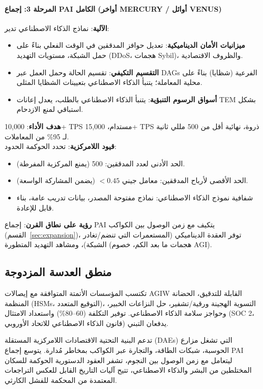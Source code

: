 \documentclass[11pt]{article}
\begin{document}
\paragraph{المرحلة 3: إجماع PAI الكامل (أواخر MERCURY / أوائل VENUS)}
\textbf{الآلية}: نماذج الذكاء الاصطناعي تدير:
\begin{itemize}[noitemsep]
  \item \textbf{ميزانيات الأمان الديناميكية}: تعديل حوافز المدققين في الوقت الفعلي بناءً على حمل الشبكة، مستويات التهديد (DDoS، هجمات Sybil)، والظروف الاقتصادية.
  \item \textbf{التقسيم التكيفي}: تقسيم الحالة وحمل العمل عبر DAGs الفرعية (شظايا) بناءً على محلية المعاملة؛ يتنبأ الذكاء الاصطناعي بتعيينات الشظايا المثلى.
  \item \textbf{أسواق الرسوم التنبؤية}: يتنبأ الذكاء الاصطناعي بالطلب، يعدل إعانات TEM بشكل استباقي لمنع الازدحام.
\end{itemize}
\textbf{هدف الأداء}: 10,000+ TPS مستدام، 15,000+ TPS ذروة، نهائية أقل من 500 مللي ثانية لـ 95\% من المعاملات.\\
\textbf{قيود اللامركزية}: تحدد الحوكمة الحدود:
\begin{itemize}[noitemsep]
  \item الحد الأدنى لعدد المدققين: 500 (يمنع المركزية المفرطة).
  \item الحد الأقصى لأرباح المدققين: معامل جيني $<0.45$ (يضمن المشاركة الواسعة).
  \item شفافية نموذج الذكاء الاصطناعي: نماذج مفتوحة المصدر، بيانات تدريب عامة، بناء قابل للإعادة.
\end{itemize}
\textbf{رؤية على نطاق القرن}: إجماع PAI يتكيف مع زمن الوصول بين الكواكب (القسم~\ref{sec:expansion})، توفر العقدة الديناميكي (المستعمرات التي تنضم/تغادر الشبكة)، ومشاهد التهديد المتطورة (هجمات ما بعد الكم، خصوم AGI).

\subsection{منطق العدسة المزدوجة}
\begin{description}[style=nextline]
  \item[قريب المدى (عصر MERCURY)] تكتسب المؤسسات الأتمتة المتوافقة مع إيصالات AGIW القابلة للتدقيق، الحضانة المنظمة (HSMs، التوقيع المتعدد)، التسوية الهجينة ورقية/تشفير، حل النزاعات الخبير، وحواجز سلامة الذكاء الاصطناعي. توفير التكلفة (60--80\%) واستعداد الامتثال (SOC 2، قانون الذكاء الاصطناعي للاتحاد الأوروبي) يدفعان التبني.
  \item[على نطاق القرن (VENUS حتى ANDROMEDA)] تدعم البنية التحتية الاقتصادات اللامركزية المستقلة (DAEs) التي تشغل مزارع الحوسبة، شبكات الطاقة، والتجارة عبر الكواكب بمخاطر مُدارة. يتوسع إجماع PAI ليتعامل مع زمن الوصول بين النجوم، تشفر العقود الدستورية الحوكمة للسكان المختلطين من البشر والذكاء الاصطناعي، تتيح آليات التاريخ القابل للعكس التراجعات المعتمدة من المحكمة للفشل الكارثي.
\end{description}
\end{document}
